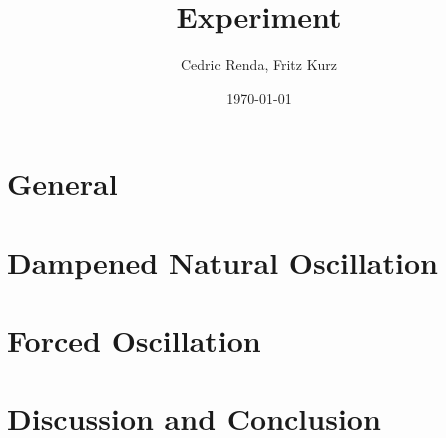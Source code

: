 \documentclass[12pt,a4paper]{article}
\title{Experiment}
\author{Cedric Renda, Fritz Kurz}
\date{\today }
\begin{document}
\maketitle


\tableofcontents

\section{General}



\section{Dampened Natural Oscillation}
%




\section{Forced Oscillation}
%





\section{Discussion and Conclusion}


\newpage

\end{document}
